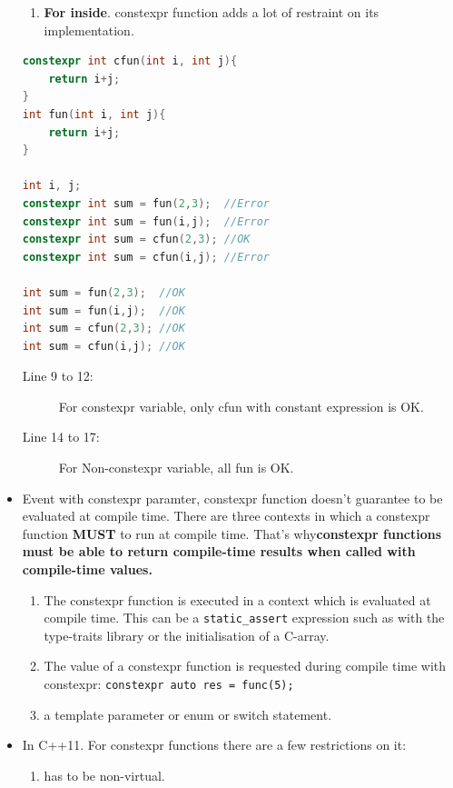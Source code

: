 \documentclass[a4paper,11pt,twoside]{book}
\begin{document}
\begin{itemize}
\begin{enumerate}
		\item \textbf{For inside}. constexpr function adds a lot of restraint on its implementation.


	\end{enumerate}
	
\begin{lstlisting}[frame=single, language=c++]
constexpr int cfun(int i, int j){
	return i+j;
}
int fun(int i, int j){
	return i+j;
}
	
int i, j;
constexpr int sum = fun(2,3);  //Error
constexpr int sum = fun(i,j);  //Error
constexpr int sum = cfun(2,3); //OK
constexpr int sum = cfun(i,j); //Error

int sum = fun(2,3);  //OK
int sum = fun(i,j);  //OK
int sum = cfun(2,3); //OK
int sum = cfun(i,j); //OK
\end{lstlisting}

\begin{description}
	\item[Line 9 to 12:] For constexpr variable, only cfun with constant expression is OK.
	\item[Line 14 to 17:] For Non-constexpr variable, all fun is OK.
\end{description}
	
	\item Event with constexpr paramter, constexpr function doesn't guarantee to be evaluated at compile time. There are three contexts in which a constexpr function \textbf{MUST} to run at compile time. That's why\textbf{constexpr functions must be able to return compile-time results when called with compile-time values.}
	\begin{enumerate}
		\item The constexpr function is executed in a context which is evaluated at compile time. This can be a \texttt{static\_assert} expression such as with the type-traits library or the initialisation of a C-array.
		
		\item The value of a constexpr function is requested during compile time with constexpr: \texttt{constexpr auto res = func(5);}
		
		\item a template parameter or enum or switch statement.
	\end{enumerate}
	
	\item In C++11. For constexpr functions there are a few restrictions on it:
	\begin{enumerate}
		\item has to be non-virtual.
		

\end{enumerate}
\end{itemize}
\end{document}
